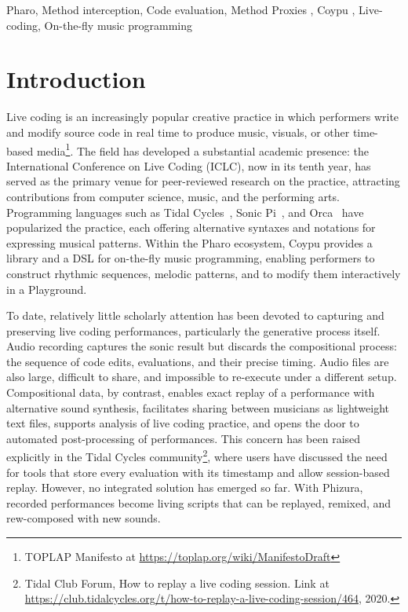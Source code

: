 \documentclass[
]{ceurart}
\begin{document}
\begin{keywords}
  Pharo\sep
  Method interception\sep
  Code evaluation\sep 
  Method Proxies \sep
  Coypu \sep
  Live-coding\sep
  On-the-fly music programming
\end{keywords}

\maketitle



\section{Introduction}\label{sec:intro}
Live coding is an increasingly popular creative practice in which performers write and modify source code in real time to produce music, visuals, or other time-based media\footnote{TOPLAP Manifesto at \url{https://toplap.org/wiki/ManifestoDraft}}.
The field has developed a substantial academic presence: the International Conference on Live Coding (ICLC), now in its tenth year, has served as the primary venue for peer-reviewed research on the practice, attracting contributions from computer science, music, and the performing arts.
Programming languages such as Tidal Cycles~\cite{McLe14a}, Sonic Pi~\cite{Aaro16a}, and Orca~\cite{Mess21a} have popularized the practice, each offering alternative syntaxes and notations for expressing musical patterns. Within the Pharo ecosystem, Coypu\cite{Cipr25c} provides a library and a DSL for on-the-fly music programming, enabling performers to construct rhythmic sequences, melodic patterns, and to modify them interactively in a Playground.

To date, relatively little scholarly attention has been devoted to capturing and preserving live coding performances, particularly the generative process itself. Audio recording captures the sonic result but discards the compositional process: the sequence of code edits, evaluations, and their precise timing. Audio files are also large, difficult to share, and impossible to re-execute under a different setup. Compositional data, by contrast, enables exact replay of a performance with alternative sound synthesis, facilitates sharing between musicians as lightweight text files, supports analysis of live coding practice, and opens the door to automated post-processing of performances. This concern has been raised explicitly in the Tidal Cycles community\footnote{Tidal Club Forum, How to replay a live coding session. Link at \url{https://club.tidalcycles.org/t/how-to-replay-a-live-coding-session/464}, 2020.}, where users have discussed the need for tools that store every evaluation with its timestamp and allow session-based replay. However, no integrated solution has emerged so far. With Phizura, recorded performances become living scripts that can be replayed, remixed, and rew-composed with new sounds.
\end{document}

